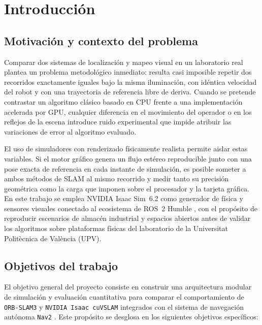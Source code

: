 \chapter{Introducción}
\label{sec:introduccion}

\section{Motivación y contexto del problema}
\label{sec:motivacion}

Comparar dos sistemas de localización y mapeo visual en un laboratorio real plantea un problema metodológico inmediato: resulta casi imposible repetir dos recorridos exactamente iguales bajo la misma iluminación, con idéntica velocidad del robot y con una trayectoria de referencia libre de deriva. Cuando se pretende contrastar un algoritmo clásico basado en CPU frente a una implementación acelerada por GPU, cualquier diferencia en el movimiento del operador o en los reflejos de la escena introduce ruido experimental que impide atribuir las variaciones de error al algoritmo evaluado.

El uso de simuladores con renderizado físicamente realista permite aislar estas variables. Si el motor gráfico genera un flujo estéreo reproducible junto con una pose exacta de referencia en cada instante de simulación, es posible someter a ambos métodos de SLAM al mismo recorrido y medir tanto su precisión geométrica como la carga que imponen sobre el procesador y la tarjeta gráfica. En este trabajo se emplea NVIDIA Isaac Sim~6.2 como generador de física y sensores visuales conectado al ecosistema de ROS~2 Humble \parencite{macenski2022ros2}, con el propósito de reproducir escenarios de almacén industrial y espacios abiertos antes de validar los algoritmos sobre plataformas físicas del laboratorio de la Universitat Politècnica de València (UPV).

\section{Objetivos del trabajo}
\label{sec:objetivos}

El objetivo general del proyecto consiste en construir una arquitectura modular de simulación y evaluación cuantitativa para comparar el comportamiento de \texttt{ORB-SLAM3} \parencite{campos2021orbslam3} y \texttt{NVIDIA Isaac cuVSLAM} \parencite{korovko2025cuvslam} integrados con el sistema de navegación autónoma \texttt{Nav2} \parencite{macenski2020nav2}. Este propósito se desglosa en los siguientes objetivos específicos:

